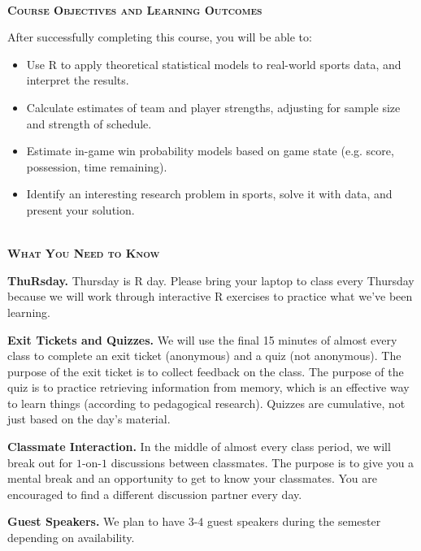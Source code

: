 \documentclass[11pt]{article}
\begin{document}
~\\
\textbf{\textsc{Course Objectives and Learning Outcomes}}
\begin{adjustwidth}{1cm}{0cm}
  After successfully completing this course, you will be able to:
  \begin{itemize}
    \item Use R to apply theoretical statistical models to real-world sports data, and interpret the results.
    \item Calculate estimates of team and player strengths, adjusting for sample size and strength of schedule.
    \item Estimate in-game win probability models based on game state (e.g. score, possession, time remaining).
    \item Identify an interesting research problem in sports, solve it with data, and present your solution.
  \end{itemize}
\end{adjustwidth}

~\\
\textbf{\textsc{What You Need to Know}}
\begin{adjustwidth}{1cm}{0cm}
  \textbf{ThuRsday.} Thursday is R day. Please bring your laptop to class every Thursday because we will work through interactive R exercises to practice what we've been learning.

  \textbf{Exit Tickets and Quizzes.} We will use the final 15 minutes of almost every class to complete an exit ticket (anonymous) and a quiz (not anonymous). The purpose of the exit ticket is to collect feedback on the class. The purpose of the quiz is to practice retrieving information from memory, which is an effective way to learn things (according to pedagogical research). Quizzes are cumulative, not just based on the day's material.

  \textbf{Classmate Interaction.} In the middle of almost every class period, we will break out for $1$-on-$1$ discussions between classmates. The purpose is to give you a mental break and an opportunity to get to know your classmates. You are encouraged to find a different discussion partner every day.

  \textbf{Guest Speakers.} We plan to have $3$-$4$ guest speakers during the semester depending on availability.
\end{adjustwidth}
\end{document}
